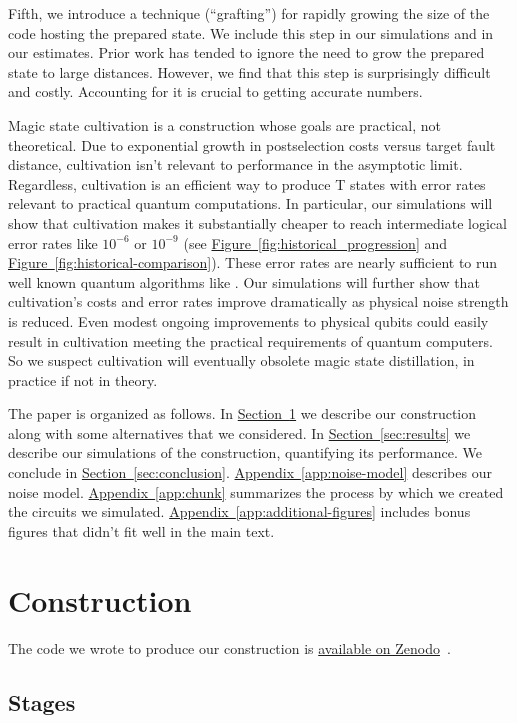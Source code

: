 \documentclass[onecolumn,unpublished,a4paper]{quantumarticle}
\theoremstyle{definition}
\renewcommand{\sec}[1]{\hyperref[sec:#1]{Section~\ref*{sec:#1}}}
\DeclareRobustCommand{\app}[1]{\hyperref[app:#1]{Appendix~\ref*{app:#1}}}
\newcommand{\fig}[1]{\hyperref[fig:#1]{Figure~\ref*{fig:#1}}}
\begin{document}
Fifth, we introduce a technique (``grafting'') for rapidly growing the size of the code hosting the prepared state.
We include this step in our simulations and in our estimates.
Prior work has tended to ignore the need to grow the prepared state to large distances.
However, we find that this step is surprisingly difficult and costly.
Accounting for it is crucial to getting accurate numbers.

Magic state cultivation is a construction whose goals are practical, not theoretical.
Due to exponential growth in postselection costs versus target fault distance, cultivation isn't relevant to performance in the asymptotic limit.
Regardless, cultivation is an efficient way to produce T states with error rates relevant to practical quantum computations.
In particular, our simulations will show that cultivation makes it substantially cheaper to reach intermediate logical error rates like $10^{-6}$ or $10^{-9}$ (see \fig{historical_progression} and \fig{historical-comparison}).
These error rates are nearly sufficient to run well known quantum algorithms like \cite{gidney2017factoring,haner2020ellipticcurve,babbush2018}.
Our simulations will further show that cultivation's costs and error rates improve dramatically as physical noise strength is reduced.
Even modest ongoing improvements to physical qubits could easily result in cultivation meeting the practical requirements of quantum computers.
So we suspect cultivation will eventually obsolete magic state distillation, in practice if not in theory.

The paper is organized as follows.
In \sec{construction} we describe our construction along with some alternatives that we considered.
In \sec{results} we describe our simulations of the construction, quantifying its performance.
We conclude in \sec{conclusion}.
\app{noise-model} describes our noise model.
\app{chunk} summarizes the process by which we created the circuits we simulated.
\app{additional-figures} includes bonus figures that didn't fit well in the main text.

\section{Construction}
\label{sec:construction}

The code we wrote to produce our construction is \href{https://doi.org/10.5281/zenodo.13777072}{available on Zenodo}~\cite{gidneyy2024cultivationdata}.


\subsection{Stages}
\end{document}
